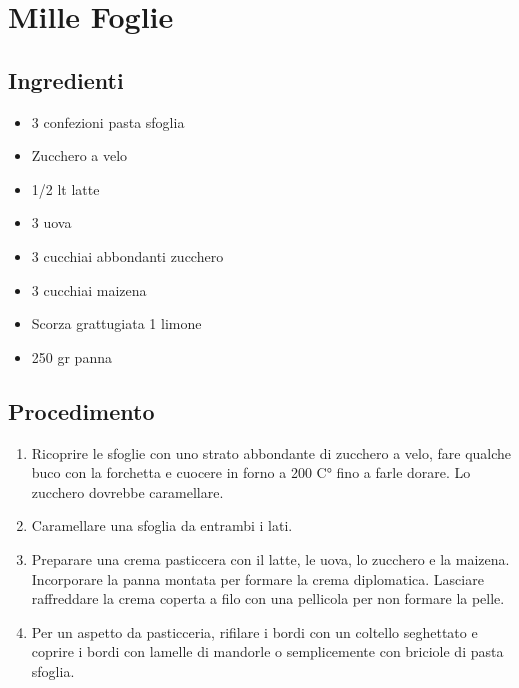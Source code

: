 \section{Mille Foglie}
\subsection{Ingredienti}
\begin{itemize}
\item 3 confezioni pasta sfoglia  
\item Zucchero a velo  
\item 1/2 lt latte  
\item 3 uova  
\item 3 cucchiai abbondanti zucchero  
\item 3 cucchiai maizena  
\item Scorza grattugiata 1 limone  
\item 250 gr panna
\end{itemize}
\subsection{Procedimento}
\begin{enumerate}
\item  Ricoprire le sfoglie con uno strato abbondante di zucchero a velo, fare qualche buco con la forchetta e cuocere in forno a 200 C° fino a farle dorare. Lo zucchero dovrebbe caramellare.  
\item  Caramellare una sfoglia da entrambi i lati.  
\item  Preparare una crema pasticcera con il latte, le uova, lo zucchero e la maizena. Incorporare la panna montata per formare la crema diplomatica. Lasciare raffreddare la crema coperta a filo con una pellicola per non formare la pelle.  
\item  Per un aspetto da pasticceria, rifilare i bordi con un coltello seghettato e coprire i bordi con lamelle di mandorle o semplicemente con briciole di pasta sfoglia.
\end{enumerate}
